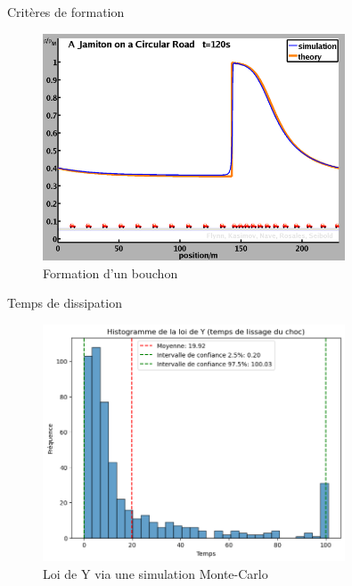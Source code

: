 \documentclass[10pt]{beamer}
\begin{document}
\begin{frame}{Critères de formation}
  \begin{figure}
    \centering
    \includegraphics[width=0.8\textwidth]{images/traffic_jam_mit.png}
    \caption{Formation d'un bouchon \cite{trafficJamMIT}}
  \end{figure}
\end{frame}

\begin{frame}{Temps de dissipation}
  \begin{figure}
    \centering
    \includegraphics[width=0.8\textwidth]{images/loi_de_Y.png}
    \caption{Loi de Y via une simulation Monte-Carlo}
  \end{figure}
\end{frame}
\end{document}
